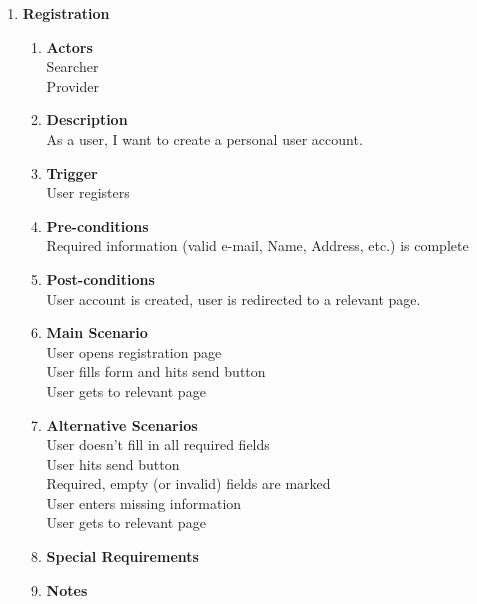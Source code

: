 \documentclass{scrreprt}
\begin{document}
\begin{enumerate}
	\item \textbf{Registration}
	\begin{enumerate}
		\item \textbf{Actors}  \\
			Searcher \\
			Provider \\

		\item \textbf{Description} \\
			As a user, I want to create a personal user account. \\
			
		\item \textbf{Trigger} \\
			User registers\\

		\item \textbf{Pre-conditions} \\
			Required information (valid e-mail, Name, Address, etc.) is complete\\

		\item \textbf{Post-conditions} \\
			User account is created, user is redirected to a relevant page.\\

		\item \textbf{Main Scenario} \\
			User opens registration page \\
			User fills form and hits send button \\
			User gets to relevant page \\

		\item \textbf{Alternative Scenarios} \\
			User doesn't fill in all required fields\\
			User hits send button\\
			Required, empty (or invalid) fields are marked\\
			User enters missing information\\
			User gets to relevant page\\
		\item \textbf{Special Requirements} \\

		\item \textbf{Notes} \\
	\end{enumerate}


\end{enumerate}
\end{document}

